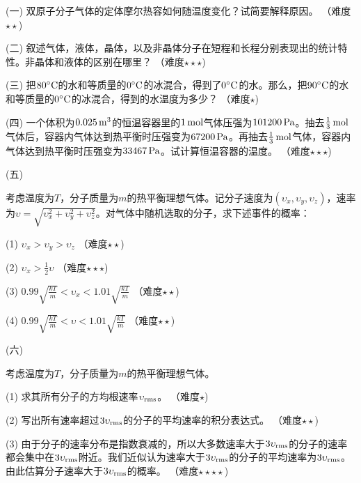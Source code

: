 \documentclass[12pt,CJK]{article}
\begin{document}
\bch




\bitem


\item[(一)]{双原子分子气体的定体摩尔热容如何随温度变化？试简要解释原因。  （难度$\star\star$)}

\item[(二)]{叙述气体，液体，晶体，以及非晶体分子在短程和长程分别表现出的统计特性。非晶体和液体的区别在哪里？ （难度$\star\star\star$)}

\item[(三)]{把$80^\circ \mathrm{C}$的水和等质量的$0^\circ \mathrm{C}$的冰混合，得到了$0^\circ \mathrm{C}$的水。那么，把$90^\circ \mathrm{C}$的水和等质量的$0^\circ \mathrm{C}$的冰混合，得到的水温度为多少？  （难度$\star$)}

\item[(四)]{一个体积为$0.025\,\mathrm{m}^3$的恒温容器里的$1\,\mathrm{mol}$气体压强为$101200 \,\mathrm{Pa}$。抽去$\frac{1}{3}\,\mathrm{mol}$气体后，容器内气体达到热平衡时压强变为$67200\,\mathrm{Pa}$。再抽去$\frac{1}{3}\,\mathrm{mol}$气体，容器内气体达到热平衡时压强变为$33467\,\mathrm{Pa}$。试计算恒温容器的温度。  （难度$\star\star\star$)
}

\item[(五)]{ 考虑温度为$T$，分子质量为$m$的热平衡理想气体。记分子速度为$(\upsilon_x, \upsilon_y, \upsilon_z)$，速率为$\upsilon = \sqrt{\upsilon_x^2+\upsilon_y^2+\upsilon_z^2}$。对气体中随机选取的分子，求下述事件的概率：
    \bitem
	\item[(1)] { $\upsilon_x > \upsilon_y>\upsilon_z $  （难度$\star\star$)}
	\item[(2)] { $\upsilon_x > \frac{1}{2} \upsilon $  （难度$\star\star\star$)}
	\item[(3)] { $ 0.99\sqrt{\frac{kT}{m}}<\upsilon_x < 1.01 \sqrt{\frac{kT}{m}} $  （难度$\star\star$)}
	\item[(4)] { $ 0.99\sqrt{\frac{kT}{m}}<\upsilon < 1.01 \sqrt{\frac{kT}{m}} $  （难度$\star\star$)}
    \eitem
}

\item[(六)]{ 考虑温度为$T$，分子质量为$m$的热平衡理想气体。
    \bitem
	\item[(1)] {求其所有分子的方均根速率$\upsilon_{\rm rms}$。  （难度$\star$)}
	\item[(2)] {写出所有速率超过$3\upsilon_{\rm rms}$的分子的平均速率的积分表达式。  （难度$\star\star$)}
	\item[(3)] {由于分子的速率分布是指数衰减的，所以大多数速率大于$3\upsilon_{\rm rms}$的分子的速率都会集中在$3\upsilon_{\rm rms}$附近。我们近似认为速率大于$3\upsilon_{\rm rms}$的分子的平均速率为$3\upsilon_{\rm rms}$。由此估算分子速率大于$3\upsilon_{\rm rms}$的概率。  （难度$\star\star\star\star$)}
    \eitem
}
\end{document}
